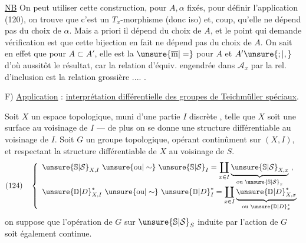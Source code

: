 \uline{NB} On peut utiliser cette construction, pour $A,\alpha$ fixés,
pour définir l'application (120), on trouve que c'est un
$T_x$-morphisme (donc iso) et,
coup, qu'elle ne dépend pas du choix de $\alpha$.
Mais a priori il dépend  du choix de $A$, et le point qui
demande vérification est que cette bijection en fait ne dépend pas du choix
de $A$. On sait en effet que pour $A\subset A'$, elle est la
$\unsure{\overline{\mathrm m}|=}$ pour $A$ et $A'\unsure{;|,}$
d'où aussitôt le résultat, car la relation d'équiv. engendrée dans
$\mathcal{A}_x$ par la rel. d'inclusion est la relation grossière .... .



F) \uline{Application} : \uline{interprétation différentielle des groupes
de Teichmüller spéciaux}.

Soit $X$ un espace topologique, muni d'une partie $I$ discrète
, telle que $X$ soit une surface au voisinage de $I$ ---
de plus on se donne une structure différentiable 
au voisinage de $I$. Soit $G$  un groupe
topologique, opérant continûment sur $(X,I)$, et respectant la structure
différentiable de $X$ au voisinage de $S$. 
\[
(124)\quad\left\{\begin{array}{l}
\unsure{\mathbb{S}|\mathcal{S}}_{X,I}\ \unsure{\text{ou}|\sim}\ \unsure{\mathbb{S}|\mathcal{S}}_I
=\displaystyle\coprod_{x\in I}
\underbrace{\unsure{\mathbb{S}|\mathcal{S}}_{X,x}}_{\text{ou }\unsure{\mathbb{S}|\mathcal{S}}_x}\ ,\\[8pt]
\unsure{\mathbb{D}|D}_{X,I}^{*}\ \unsure{\text{ou}|\sim}\ \unsure{\mathbb{D}|D}_{I}^{*}
=\displaystyle\coprod_{x\in I}
\underbrace{\unsure{\mathbb{D}|D}_{X,x}^{*}}_{\text{ou }\unsure{\mathbb{D}|D}_x^{*}}
\end{array}\right.
\]
on suppose que l'opération de $G$ sur $\unsure{\mathbb{S}|\mathcal{S}}_S$ induite par
l'action de $G$ soit également continue.

